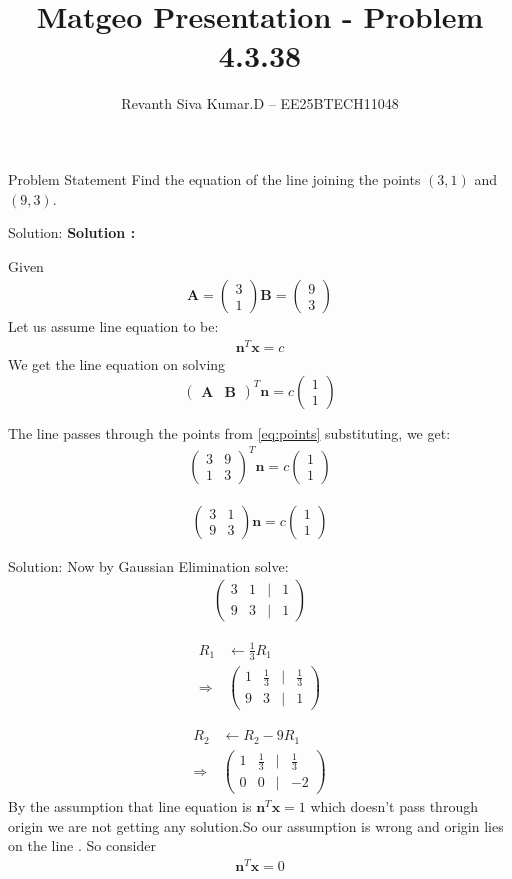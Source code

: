 \documentclass{beamer}
\title{Matgeo Presentation - Problem 4.3.38}
\author{Revanth Siva Kumar.D -- EE25BTECH11048}
\numberwithin{equation}{section}
\newcommand{\myvec}[1]{\ensuremath{\begin{pmatrix}#1\end{pmatrix}}}
\let\vec\mathbf
\begin{document}
\begin{frame}
\titlepage
\end{frame}

\begin{frame}{Problem Statement}
Find the equation of the line joining the points $(3,1)$ and $(9,3)$. 
\end{frame}

\begin{frame}{Solution:}
\textbf{Solution :} 

Given 
\begin{align}
    \vec{A}=\myvec{3\\1} \vec{B}=\myvec{9\\3} 
    \label{eq:points}
\end{align}
Let us assume line equation to be:
\begin{align}
    \vec{n}^T \vec{x} = c
\end{align} 
    We get the line equation on solving \[\myvec{\vec{A}&\vec{B}}^T\vec{n}=c\myvec{1\\1}\] 

The line passes through the points from \eqref{eq:points} substituting, we get:
\begin{align}
    \myvec{3 & 9 \\
       1 & 3  }^T\vec{n}=c\myvec{1 \\ 1}
\end{align}

\begin{align}
    \myvec{3 & 1 \\
       9 & 3  }\vec{n}=c\myvec{1 \\ 1}
\end{align}
\end{frame}
\begin{frame}{Solution:}
Now by Gaussian Elimination solve:
\begin{align}
\myvec{3 & 1 & \big| & 1 \\
         9 & 3 & \big| & 1 }
\end{align}

\begin{align}
R_{1} &\leftarrow \frac{1}{3}R_{1} \nonumber\\
\Rightarrow\ 
&\myvec{1 & \frac{1}{3} & \big| & \frac{1}{3} \\
         9 & 3 & \big| & 1 }
\end{align}

\begin{align}
R_{2} &\leftarrow R_{2}-9R_{1} \nonumber\\
\Rightarrow\ 
&\myvec{1 & \frac{1}{3} & \big| & \frac{1}{3} \\
         0 & 0 & \big| & -2 }
\end{align}
By the assumption that line equation is $\vec{n}^T\vec{x}=1$ which doesn't pass through origin we are not getting any solution.So our assumption is wrong and origin lies on the line . 
So consider \begin{align}
    \vec{n}^T \vec{x} = 0
\end{align} 
\end{frame}
\end{document}
